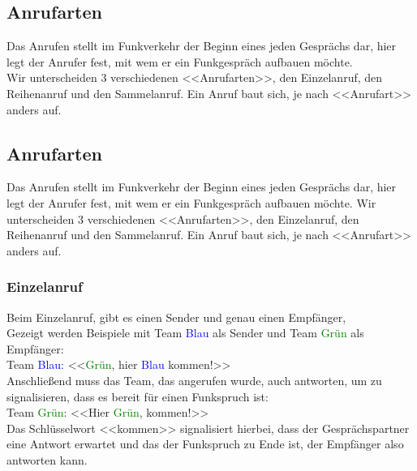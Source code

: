 \subsection{Anrufarten} 
Das Anrufen stellt im Funkverkehr der Beginn eines jeden Gesprächs dar, hier legt der
Anrufer fest, mit wem er ein Funkgespräch aufbauen möchte. \\
Wir unterscheiden 3 verschiedenen <<Anrufarten>>, den Einzelanruf, den Reihenanruf und
den Sammelanruf. Ein Anruf baut sich, je nach <<Anrufart>> anders auf. \\
\subsection{ Anrufarten}
Das Anrufen stellt im Funkverkehr der Beginn eines jeden Gesprächs dar, hier legt der Anrufer fest, mit wem er ein Funkgespräch aufbauen möchte. Wir unterscheiden 3 verschiedenen <<Anrufarten>>, den Einzelanruf, den Reihenanruf und den Sammelanruf. Ein Anruf baut sich, je nach <<Anrufart>> anders auf. \\

\subsubsection{Einzelanruf}
Beim Einzelanruf, gibt es einen Sender und genau einen Empfänger, \\
Gezeigt werden Beispiele mit Team \textcolor{blue}{Blau} als Sender und Team \textcolor{green}{Grün} als Empfänger: \\
Team \textcolor{blue}{Blau}: <<\textcolor{green}{Grün}, hier \textcolor{blue}{Blau} kommen!>> \\
Anschließend muss das Team, das angerufen wurde, auch antworten, um zu signalisieren, dass es bereit für einen Funkspruch ist: \\
Team \textcolor{green}{Grün}: <<Hier \textcolor{green}{Grün}, kommen!>> \\
Das Schlüsselwort <<kommen>> signalisiert hierbei, dass der Gesprächspartner eine Antwort erwartet und das der Funkspruch zu Ende ist, der Empfänger also antworten kann. \\

